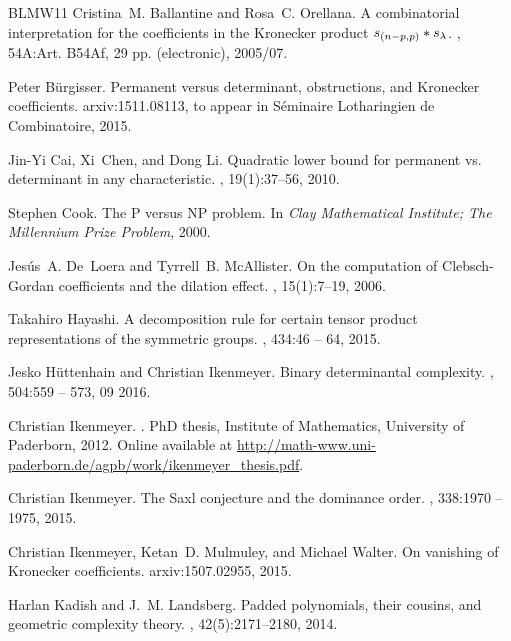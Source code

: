 \documentclass{article}
\numberwithin{equation}{section}
\theoremstyle{definition}
\begin{document}
\begin{thebibliography}{BLMW11}
Cristina~M. Ballantine and Rosa~C. Orellana.
\newblock A combinatorial interpretation for the coefficients in the
  {K}ronecker product {$s\sb {(n-p,p)}\ast s\sb \lambda$}.
, 54A:Art. B54Af, 29 pp. (electronic),
  2005/07.

Peter B{\"u}rgisser.
\newblock Permanent versus determinant, obstructions, and {K}ronecker
  coefficients.
\newblock arxiv:1511.08113, to appear in S\'eminaire Lotharingien de
  Combinatoire, 2015.

Jin-Yi Cai, Xi~Chen, and Dong Li.
\newblock Quadratic lower bound for permanent vs. determinant in any
  characteristic.
, 19(1):37--56, 2010.

Stephen Cook.
\newblock The {P} versus {NP} problem.
\newblock In {\em {C}lay {M}athematical {I}nstitute; {T}he {M}illennium {P}rize
  {P}roblem}, 2000.

Jes{\'u}s~A. De~Loera and Tyrrell~B. McAllister.
\newblock On the computation of {C}lebsch-{G}ordan coefficients and the
  dilation effect.
, 15(1):7--19, 2006.

Takahiro Hayashi.
\newblock A decomposition rule for certain tensor product representations of
  the symmetric groups.
, 434:46 -- 64, 2015.

Jesko H{\"{u}}ttenhain and Christian Ikenmeyer.
\newblock Binary determinantal complexity.
, 504:559 -- 573, 09 2016.

Christian Ikenmeyer.
.
\newblock PhD thesis, Institute of Mathematics, University of Paderborn, 2012.
\newblock Online available at
  \url{http://math-www.uni-paderborn.de/agpb/work/ikenmeyer_thesis.pdf}.

Christian Ikenmeyer.
\newblock The {S}axl conjecture and the dominance order.
, 338:1970 -- 1975, 2015.

Christian Ikenmeyer, Ketan~D. Mulmuley, and Michael Walter.
\newblock On vanishing of {K}ronecker coefficients.
\newblock arxiv:1507.02955, 2015.

Harlan Kadish and J.~M. Landsberg.
\newblock Padded polynomials, their cousins, and geometric complexity theory.
, 42(5):2171--2180, 2014.


\end{thebibliography}
\end{document}
